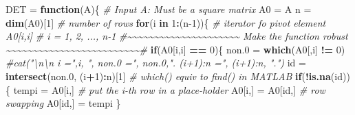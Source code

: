 \documentclass[
]{book}
\newenvironment{Shaded}{\begin{snugshade}}{\end{snugshade}}
\newcommand{\CommentTok}[1]{\textcolor[rgb]{0.56,0.35,0.01}{\textit{#1}}}
\newcommand{\ControlFlowTok}[1]{\textcolor[rgb]{0.13,0.29,0.53}{\textbf{#1}}}
\newcommand{\DecValTok}[1]{\textcolor[rgb]{0.00,0.00,0.81}{#1}}
\newcommand{\FloatTok}[1]{\textcolor[rgb]{0.00,0.00,0.81}{#1}}
\newcommand{\FunctionTok}[1]{\textcolor[rgb]{0.13,0.29,0.53}{\textbf{#1}}}
\newcommand{\NormalTok}[1]{#1}
\newcommand{\OtherTok}[1]{\textcolor[rgb]{0.56,0.35,0.01}{#1}}
\newcommand{\SpecialCharTok}[1]{\textcolor[rgb]{0.81,0.36,0.00}{\textbf{#1}}}
\begin{document}
\begin{Shaded}
\begin{Highlighting}[]
\NormalTok{DET }\OtherTok{=} \ControlFlowTok{function}\NormalTok{(A)\{}
  \CommentTok{\# Input A: Must be a square matrix}
\NormalTok{  A0 }\OtherTok{=}\NormalTok{ A        }
\NormalTok{  n }\OtherTok{=} \FunctionTok{dim}\NormalTok{(A0)[}\DecValTok{1}\NormalTok{]                }\CommentTok{\# number of rows}
  \ControlFlowTok{for}\NormalTok{(i }\ControlFlowTok{in} \DecValTok{1}\SpecialCharTok{:}\NormalTok{(n}\DecValTok{{-}1}\NormalTok{))\{            }\CommentTok{\# iterator fo pivot element A0[i,i]}
                                \CommentTok{\# i = 1, 2, ..., n{-}1}
      \CommentTok{\#\textasciitilde{}\textasciitilde{}\textasciitilde{}\textasciitilde{}\textasciitilde{}\textasciitilde{}\textasciitilde{}\textasciitilde{}\textasciitilde{}\textasciitilde{}\textasciitilde{}\textasciitilde{}\textasciitilde{}\textasciitilde{}\textasciitilde{}\textasciitilde{}\textasciitilde{}\textasciitilde{}\textasciitilde{}\textasciitilde{}\textasciitilde{}   Make the function robust  \textasciitilde{}\textasciitilde{}\textasciitilde{}\textasciitilde{}\textasciitilde{}\textasciitilde{}\textasciitilde{}\textasciitilde{}\textasciitilde{}\textasciitilde{}\textasciitilde{}\textasciitilde{}\textasciitilde{}\textasciitilde{}\textasciitilde{}\textasciitilde{}\textasciitilde{}\textasciitilde{}\textasciitilde{}\textasciitilde{}\textasciitilde{}\textasciitilde{}\textasciitilde{}\textasciitilde{}\textasciitilde{}\#}
      \ControlFlowTok{if}\NormalTok{(A0[i,i] }\SpecialCharTok{==} \DecValTok{0}\NormalTok{)\{}
\NormalTok{          non}\FloatTok{.0} \OtherTok{=} \FunctionTok{which}\NormalTok{(A0[,i] }\SpecialCharTok{!=} \DecValTok{0}\NormalTok{)}
              \CommentTok{\#cat("\textbackslash{}n\textbackslash{}n i =",i, ", non.0 =", non.0,". (i+1):n =", (i+1):n, ".")}
\NormalTok{              id }\OtherTok{=} \FunctionTok{intersect}\NormalTok{(non}\FloatTok{.0}\NormalTok{, (i}\SpecialCharTok{+}\DecValTok{1}\NormalTok{)}\SpecialCharTok{:}\NormalTok{n)[}\DecValTok{1}\NormalTok{] }\CommentTok{\# which() equiv to find() in MATLAB}
              \ControlFlowTok{if}\NormalTok{(}\SpecialCharTok{!}\FunctionTok{is.na}\NormalTok{(id))\{}
\NormalTok{              tempi }\OtherTok{=}\NormalTok{ A0[i,]                    }\CommentTok{\# put the i{-}th row in a place{-}holder}
\NormalTok{              A0[i,] }\OtherTok{=}\NormalTok{ A0[id,]                  }\CommentTok{\# row swapping}
\NormalTok{              A0[id,] }\OtherTok{=}\NormalTok{ tempi    }
\NormalTok{            \}}

\end{Highlighting}
\end{Shaded}
\end{document}
